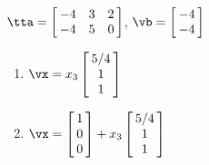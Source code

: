 {$\tta = \left[\hskip -3pt \begin{array}{ccc} -4&3&2\\  -4&5&0
\end{array}\hskip -3pt \right]$, $\vb=\left[\hskip -3pt \begin{array}{c} -4\\  -4\end{array}\hskip -3pt \right]$}
{\begin{enumerate}
\item	 $\vx=x_3\left[\hskip -3pt \begin{array}{c} 5/4\\  1\\  1\end{array}\hskip -3pt
\right]$
\item	 $\vx=\left[\hskip -3pt \begin{array}{c} 1\\  0\\  0\end{array}\hskip -3pt \right]+x_3\left[\hskip -3pt \begin{array}{c} 5/4\\  1\\  1\end{array}\hskip -3pt
\right]$ 
\end{enumerate}
 }







